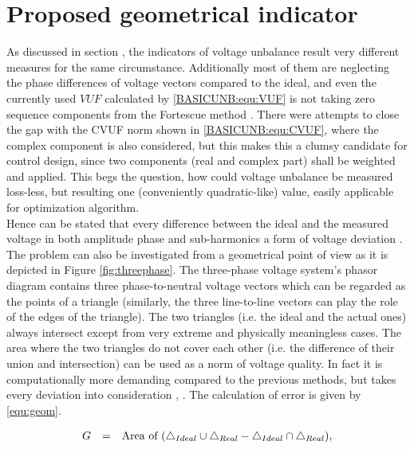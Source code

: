 \section{Proposed geometrical indicator}\label{VUB:sec:Geom}

As discussed in section , the indicators of voltage unbalance result very different measures for the same circumstance. Additionally most of them are neglecting the phase differences of voltage vectors compared to the ideal, and even the currently used $VUF$ calculated by \ref{BASICUNB:equ:VUF} is not taking zero sequence components from the Fortescue method \cite{fortescue1918method}. There were attempts to close the gap with the CVUF norm shown in \ref{BASICUNB:equ:CVUF}, where the complex component is also considered, but this makes this a clumsy candidate for control design, since two components (real and complex part) shall be weighted and applied. This begs the question, how could voltage unbalance be measured loss-less, but resulting one (conveniently quadratic-like) value, easily applicable for  optimization algorithm. \\
Hence  can be stated that every difference between the ideal and the measured voltage in both amplitude phase and sub-harmonics  a form of voltage deviation . The problem can also be investigated from a geometrical point of view as it is depicted in Figure \ref{fig:threephase}. The three-phase voltage system's phasor diagram contains three  phase-to-neutral voltage vectors which can be regarded as the points of a triangle (similarly, the three line-to-line vectors can play the role of the edges of the triangle). The two triangles (i.e. the ideal and the actual ones) always intersect except from very extreme and physically meaningless cases. The area where the two triangles do not cover each other (i.e. the difference of their union and intersection) can be used as a norm of voltage quality. In fact it is computationally more demanding compared to the previous methods, but takes every deviation into consideration \cite{Neukirchner2015}, \cite{neukirchner2015examination}. The calculation of error is given by \ref{equ:geom}.

            \begin{equation}
                \begin{array}{rcl}
                       G&=&\textnormal{Area of }(\bigtriangleup_{Ideal}\cup\bigtriangleup_{Real}-\bigtriangleup_{Ideal}\cap\bigtriangleup_{Real}),
                \end{array}
                \label{equ:geom}
            \end{equation}

